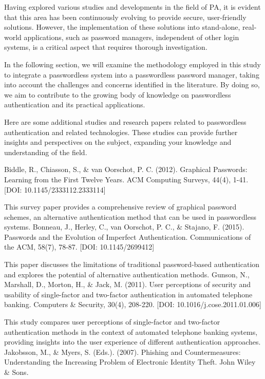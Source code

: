 Having explored various studies and developments in the field of PA, it is
evident that this area has been continuously evolving to provide secure,
user-friendly solutions.
However, the implementation of these solutions into stand-alone, real-world
applications, such as password managers, independent of other login systems, is
a critical aspect that requires thorough investigation.

In the following section, we will examine the methodology employed in this
study to integrate a passwordless system into a passwordless password manager,
taking into account the challenges and concerns identified in the literature.
By doing so, we aim to contribute to the growing body of knowledge on
passwordless authentication and its practical applications.


\iffalse
Here are some additional studies and research papers related to passwordless authentication and related technologies. These studies can provide further insights and perspectives on the subject, expanding your knowledge and understanding of the field.

Biddle, R., Chiasson, S., & van Oorschot, P. C. (2012). Graphical Passwords: Learning from the First Twelve Years. ACM Computing Surveys, 44(4), 1-41. [DOI: 10.1145/2333112.2333114]

This survey paper provides a comprehensive review of graphical password schemes, an alternative authentication method that can be used in passwordless systems.
Bonneau, J., Herley, C., van Oorschot, P. C., & Stajano, F. (2015). Passwords and the Evolution of Imperfect Authentication. Communications of the ACM, 58(7), 78-87. [DOI: 10.1145/2699412]

This paper discusses the limitations of traditional password-based authentication and explores the potential of alternative authentication methods.
Gunson, N., Marshall, D., Morton, H., & Jack, M. (2011). User perceptions of security and usability of single-factor and two-factor authentication in automated telephone banking. Computers & Security, 30(4), 208-220. [DOI: 10.1016/j.cose.2011.01.006]

This study compares user perceptions of single-factor and two-factor authentication methods in the context of automated telephone banking systems, providing insights into the user experience of different authentication approaches.
Jakobsson, M., & Myers, S. (Eds.). (2007). Phishing and Countermeasures: Understanding the Increasing Problem of Electronic Identity Theft. John Wiley & Sons.

